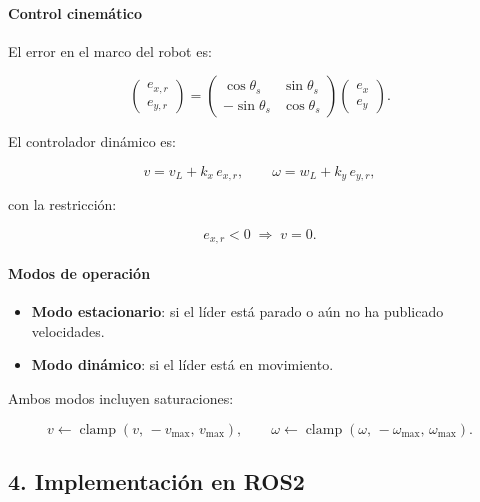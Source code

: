 \paragraph{Control cinemático}

El error en el marco del robot es:



\[
\begin{pmatrix}
e_{x,r} \\ e_{y,r}
\end{pmatrix}
=
\begin{pmatrix}
\cos\theta_s & \sin\theta_s \\
-\sin\theta_s & \cos\theta_s
\end{pmatrix}
\begin{pmatrix}
e_x \\ e_y
\end{pmatrix}.
\]



El controlador dinámico es:

\begin{equation}
v = v_L + k_x\, e_{x,r}, \qquad
\omega = w_L + k_y\, e_{y,r},
\label{eq:t3_control}
\end{equation}

con la restricción:



\[
e_{x,r} < 0 \;\Rightarrow\; v = 0.
\]



\paragraph{Modos de operación}

\begin{itemize}
    \item \textbf{Modo estacionario}: si el líder está parado o aún no ha publicado velocidades.
    \item \textbf{Modo dinámico}: si el líder está en movimiento.
\end{itemize}

Ambos modos incluyen saturaciones:



\[
v \leftarrow \operatorname{clamp}(v,\,-v_{\max},\,v_{\max}), \qquad
\omega \leftarrow \operatorname{clamp}(\omega,\,-\omega_{\max},\,\omega_{\max}).
\]



\subsection*{4. Implementación en ROS2}

